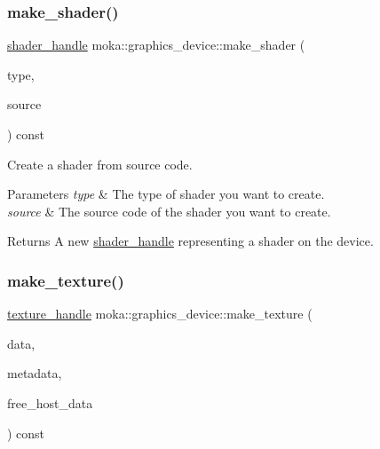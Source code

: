 \subsubsection{\texorpdfstring{make\_shader()}{make\_shader()}}
{\footnotesize\ttfamily \mbox{\hyperlink{structmoka_1_1shader__handle}{shader\+\_\+handle}} moka\+::graphics\+\_\+device\+::make\+\_\+shader (\begin{DoxyParamCaption}\item[{\mbox{\hyperlink{namespacemoka_a472008f32e5db526d38eace7d3e45772}{shader\+\_\+type}}}]{type,  }\item[{const std\+::string \&}]{source }\end{DoxyParamCaption}) const}



Create a shader from source code. 


\begin{DoxyParams}{Parameters}
{\em type} & The type of shader you want to create. \\
\hline
{\em source} & The source code of the shader you want to create. \\
\hline
\end{DoxyParams}
\begin{DoxyReturn}{Returns}
A new \mbox{\hyperlink{structmoka_1_1shader__handle}{shader\+\_\+handle}} representing a shader on the device. 
\end{DoxyReturn}
\mbox{\label{classmoka_1_1graphics__device_afc32983bf80e3af6bf2b20fa3d7721fd}} 
\subsubsection{\texorpdfstring{make\_texture()}{make\_texture()}}
{\footnotesize\ttfamily \mbox{\hyperlink{structmoka_1_1texture__handle}{texture\+\_\+handle}} moka\+::graphics\+\_\+device\+::make\+\_\+texture (\begin{DoxyParamCaption}\item[{void $\ast$$\ast$}]{data,  }\item[{\mbox{\hyperlink{structmoka_1_1texture__metadata}{texture\+\_\+metadata}} \&\&}]{metadata,  }\item[{bool}]{free\+\_\+host\+\_\+data }\end{DoxyParamCaption}) const}



